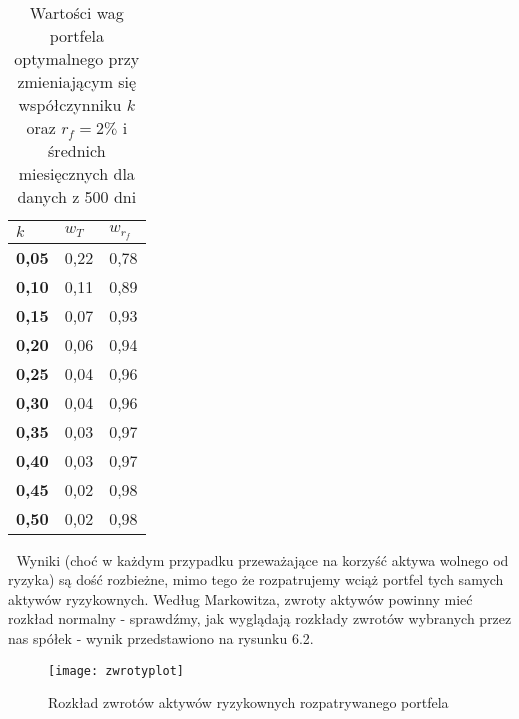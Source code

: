 \documentclass[magister]{dyplom}
\begin{document}
\begin{table}[ht]
	\centering
	\caption{Wartości wag portfela optymalnego przy zmieniającym się współczynniku $k$ oraz $r_f = 2\%$ i średnich miesięcznych dla danych z 500 dni}
	\begin{tabular}{|l|l|l|}
		\hline
		\textbf{$k$} & \textbf{$w_T$} & \textbf{$w_{r_f}$} \\ \hline
		\textbf{0,05}                                             & 0,22          & 0,78           \\ \hline
		\textbf{0,10}                                             & 0,11          & 0,89           \\ \hline
		\textbf{0,15}                                             & 0,07          & 0,93           \\ \hline
		\textbf{0,20}                                             & 0,06          & 0,94           \\ \hline
		\textbf{0,25}                                             & 0,04          & 0,96           \\ \hline
		\textbf{0,30}                                             & 0,04          & 0,96           \\ \hline
		\textbf{0,35}                                             & 0,03          & 0,97           \\ \hline
		\textbf{0,40}                                             & 0,03          & 0,97           \\ \hline
		\textbf{0,45}                                             & 0,02          & 0,98           \\ \hline
		\textbf{0,50}                                             & 0,02          & 0,98           \\ \hline
	\end{tabular}
\end{table}
\newpage
\textcolor{white}{.}
\newpage
Wyniki (choć w każdym przypadku przeważające na korzyść aktywa wolnego od ryzyka) są dość rozbieżne, mimo tego że rozpatrujemy wciąż portfel tych samych aktywów ryzykownych. Według Markowitza, zwroty aktywów powinny mieć rozkład normalny - sprawdźmy, jak wyglądają rozkłady zwrotów wybranych przez nas spółek - wynik przedstawiono na rysunku 6.2.

\begin{figure}[ht]
	\centering
	\texttt{[image: zwrotyplot]}
	\caption{Rozkład zwrotów aktywów ryzykownych rozpatrywanego portfela}
\end{figure}
\end{document}
